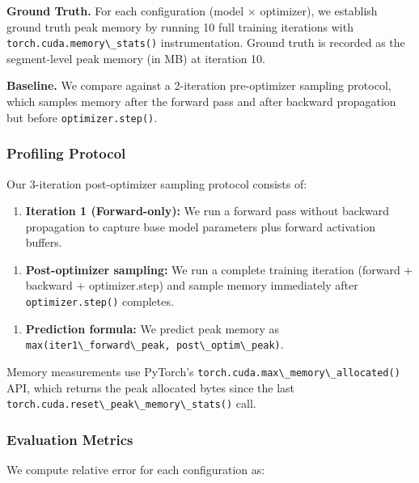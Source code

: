 \textbf{Ground Truth.} For each configuration (model $\times$ optimizer), we establish ground truth peak memory by running 10 full training iterations with \texttt{torch.cuda.memory\textbackslash \_stats()} instrumentation. Ground truth is recorded as the segment-level peak memory (in MB) at iteration 10.

\textbf{Baseline.} We compare against a 2-iteration pre-optimizer sampling protocol, which samples memory after the forward pass and after backward propagation but before \texttt{optimizer.step()}.

\subsubsection{Profiling Protocol}

Our 3-iteration post-optimizer sampling protocol consists of:

\begin{enumerate}
\item \textbf{Iteration 1 (Forward-only):} We run a forward pass without backward propagation to capture base model parameters plus forward activation buffers.
\end{enumerate}

\begin{enumerate}
\item \textbf{Post-optimizer sampling:} We run a complete training iteration (forward + backward + optimizer.step) and sample memory immediately after \texttt{optimizer.step()} completes.
\end{enumerate}

\begin{enumerate}
\item \textbf{Prediction formula:} We predict peak memory as \texttt{max(iter1\textbackslash \_forward\textbackslash \_peak, post\textbackslash \_optim\textbackslash \_peak)}.
\end{enumerate}

Memory measurements use PyTorch's \texttt{torch.cuda.max\textbackslash \_memory\textbackslash \_allocated()} API, which returns the peak allocated bytes since the last \texttt{torch.cuda.reset\textbackslash \_peak\textbackslash \_memory\textbackslash \_stats()} call.

\subsubsection{Evaluation Metrics}

We compute relative error for each configuration as:

